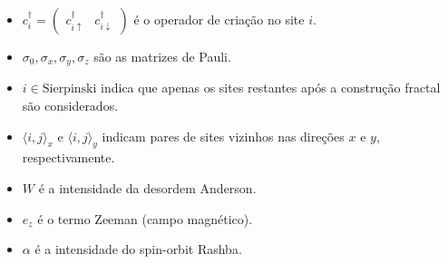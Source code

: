 \documentclass[a4paper,12pt]{article}
\begin{document}
	\begin{itemize}
		\item $c_i^\dagger = \begin{pmatrix} c_{i\uparrow}^\dagger & c_{i\downarrow}^\dagger \end{pmatrix}$ é o operador de criação no site $i$.
		\item $\sigma_0, \sigma_x, \sigma_y, \sigma_z$ são as matrizes de Pauli.
		\item $i \in \text{Sierpinski}$ indica que apenas os sites restantes após a construção fractal são considerados.
		\item $\langle i,j \rangle_x$ e $\langle i,j \rangle_y$ indicam pares de sites vizinhos nas direções $x$ e $y$, respectivamente.
		\item $W$ é a intensidade da desordem Anderson.
		\item $e_z$ é o termo Zeeman (campo magnético).
		\item $\alpha$ é a intensidade do spin-orbit Rashba.
	\end{itemize}
	
	
	
	
	
	
\end{document}
